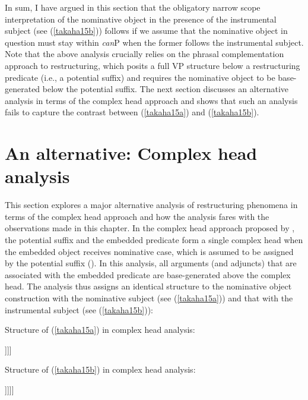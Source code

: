 \documentclass[output=paper]{langscibook}
\begin{document}
In sum, I have argued in this section that the obligatory narrow scope interpretation of the nominative object in the presence of the instrumental subject (see (\ref{takaha15b})) follows if we assume that the nominative object in question must stay within \emph{can}P when the former follows the instrumental subject. Note that the above analysis crucially relies on the phrasal complementation approach to restructuring, which posits a full VP structure below a restructuring predicate (i.e., a potential suffix) and requires the nominative object to be base-generated below the potential suffix. The next section discusses an alternative analysis in terms of the complex head approach and shows that such an analysis fails to capture the contrast between (\ref{takaha15a}) and (\ref{takaha15b}).

\section{An alternative: Complex head analysis} \label{takahas4}
This section explores a major alternative analysis of restructuring phenomena in terms of the complex head approach and how the analysis fares with the observations made in this chapter.
In the complex head approach proposed by \citet{SaitoHoshi1998}, the potential suffix and the embedded predicate form a single complex head when the embedded object receives nominative case, which is assumed to be assigned by the potential suffix (\citealt{kuno1973}). In this analysis, all arguments (and adjuncts) that are associated with the embedded predicate are base-generated above the complex head. The analysis thus assigns an identical structure to the nominative object construction with the nominative subject (see (\ref{takaha15a})) and that with the instrumental subject (see (\ref{takaha15b})):

\begin{exe}
\ex \label{takaha18}
	\begin{xlist}
	\ex \label{takaha18a}
		Structure of (\ref{takaha15a}) in complex head analysis:\\
		\begin{forest}
			[VP[SUBJ\textsubscript{NOM}][V'[OBJ\textsubscript{NOM}][V\textsubscript{1can}[V\textsubscript{2}][V\textsubscript{1can}]]]]
		\end{forest} \newpage
	\ex \label{takaha18b}
		Structure of (\ref{takaha15b}) in complex head analysis:\\
		\begin{forest}
			[VP[SUBJ\textsubscript{instr}][V'[OBJ\textsubscript{NOM}][V\textsubscript{1can}[V\textsubscript{2}][V\textsubscript{1can}]]]]]
		\end{forest}
	\end{xlist}
\end{exe}
\end{document}
